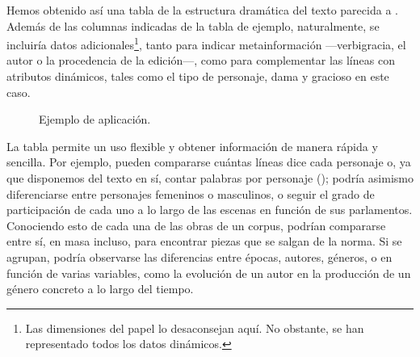 Hemos obtenido así una tabla de la estructura dramática del texto parecida a . Además de las columnas indicadas de la tabla de ejemplo, naturalmente, se incluiría datos adicionales\footnote{Las dimensiones del papel lo desaconsejan aquí. No obstante, se han representado todos los datos dinámicos.}, tanto para indicar metainformación —verbigracia, el autor o la procedencia de la edición—, como para complementar las líneas con atributos dinámicos, tales como el tipo de personaje, dama y gracioso en este caso.

\begin{figure}[!ht]
	\centering\small
	\caption{Ejemplo de aplicación.}
	\label{fig:pandasplot}
\end{figure}


La tabla permite un uso flexible y obtener información de manera rápida y sencilla. Por ejemplo, pueden compararse cuántas líneas dice cada personaje o, ya que disponemos del texto en sí, contar palabras por personaje (); podría asimismo diferenciarse entre personajes femeninos o masculinos, o seguir el grado de participación de cada uno a lo largo de las escenas en función de sus parlamentos. Conociendo esto de cada una de las obras de un corpus, podrían compararse entre sí, en masa incluso, para encontrar piezas que se salgan de la norma. Si se agrupan, podría observarse las diferencias entre épocas, autores, géneros, o en función de varias variables, como la evolución de un autor en la producción de un género concreto a lo largo del tiempo.
